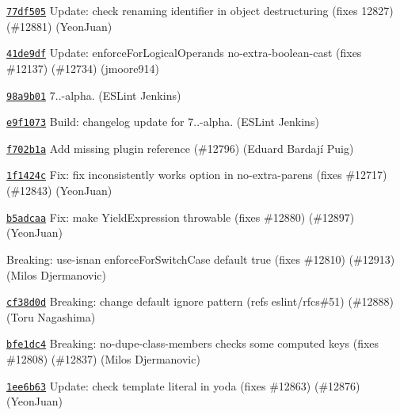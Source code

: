 \begin{DoxyItemize}
\item \href{https://github.com/eslint/eslint/commit/77df505d9a08496a8eaefeca4f885f54a21d5c5e}{\texttt{ {\ttfamily 77df505}}} Update\+: check renaming identifier in object destructuring (fixes 12827) (\#12881) (Yeon\+Juan)
\item \href{https://github.com/eslint/eslint/commit/41de9df41a30a4300243bfe4ca26f716a787b2fc}{\texttt{ {\ttfamily 41de9df}}} Update\+: enforce\+For\+Logical\+Operands no-\/extra-\/boolean-\/cast (fixes \#12137) (\#12734) (jmoore914)
\item \href{https://github.com/eslint/eslint/commit/98a9b019e52f344c1a6bc2f704c227f89692afe3}{\texttt{ {\ttfamily 98a9b01}}} 7..-\/alpha. (ESLint Jenkins)
\item \href{https://github.com/eslint/eslint/commit/e9f1073f748f8c22f754d145b1ba193e7ce82215}{\texttt{ {\ttfamily e9f1073}}} Build\+: changelog update for 7..-\/alpha. (ESLint Jenkins)
\item \href{https://github.com/eslint/eslint/commit/f702b1a54820d2b4e4993dcded99f551a98b490f}{\texttt{ {\ttfamily f702b1a}}} Add missing plugin reference (\#12796) (Eduard Bardají Puig)
\item \href{https://github.com/eslint/eslint/commit/1f1424cb200e609d58645f6c54739e11469e6265}{\texttt{ {\ttfamily 1f1424c}}} Fix\+: fix inconsistently works option in no-\/extra-\/parens (fixes \#12717) (\#12843) (Yeon\+Juan)
\item \href{https://github.com/eslint/eslint/commit/b5adcaab93f388f1d8e9d35d6f5e8c2994240850}{\texttt{ {\ttfamily b5adcaa}}} Fix\+: make Yield\+Expression throwable (fixes \#12880) (\#12897) (Yeon\+Juan)
\item \href{https://github.com/eslint/eslint/commit/4293229709dde105692347241513766e953664dd}{\texttt{ {}}} Breaking\+: use-\/isnan enforce\+For\+Switch\+Case default {\ttfamily true} (fixes \#12810) (\#12913) (Milos Djermanovic)
\item \href{https://github.com/eslint/eslint/commit/cf38d0d939b62f3670cdd59f0143fd896fccd771}{\texttt{ {\ttfamily cf38d0d}}} Breaking\+: change default ignore pattern (refs eslint/rfcs\#51) (\#12888) (Toru Nagashima)
\item \href{https://github.com/eslint/eslint/commit/bfe1dc4e614640cb69032afbb5851c1493f537e3}{\texttt{ {\ttfamily bfe1dc4}}} Breaking\+: no-\/dupe-\/class-\/members checks some computed keys (fixes \#12808) (\#12837) (Milos Djermanovic)
\item \href{https://github.com/eslint/eslint/commit/1ee6b6388305a8671c8d4c3cf30c2dbf18a1ff7e}{\texttt{ {\ttfamily 1ee6b63}}} Update\+: check template literal in yoda (fixes \#12863) (\#12876) (Yeon\+Juan)

\end{DoxyItemize}
